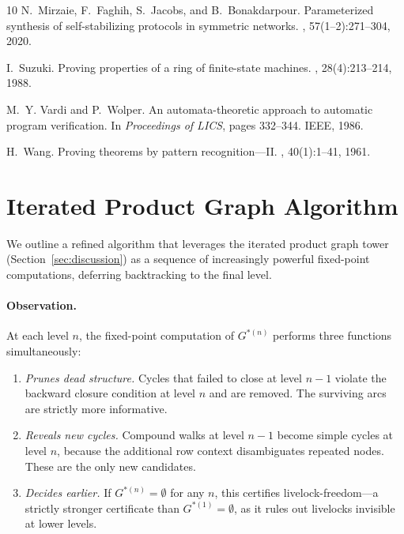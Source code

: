 \documentclass[11pt]{article}
\begin{document}
\begin{thebibliography}{10}
N.~Mirzaie, F.~Faghih, S.~Jacobs, and B.~Bonakdarpour.
\newblock Parameterized synthesis of self-stabilizing protocols in symmetric networks.
, 57(1--2):271--304, 2020.

I.~Suzuki.
\newblock Proving properties of a ring of finite-state machines.
, 28(4):213--214, 1988.

M.~Y. Vardi and P.~Wolper.
\newblock An automata-theoretic approach to automatic program verification.
\newblock In {\em Proceedings of LICS}, pages 332--344. IEEE, 1986.

H.~Wang.
\newblock Proving theorems by pattern recognition---{II}.
, 40(1):1--41, 1961.

\end{thebibliography}

\appendix

\section{Iterated Product Graph Algorithm}
\label{app:iterated}

We outline a refined algorithm that leverages the iterated product graph tower (Section~\ref{sec:discussion}) as a sequence of increasingly powerful fixed-point computations, deferring backtracking to the final level.

\paragraph{Observation.} At each level $n$, the fixed-point computation of $G^{*(n)}$ performs three functions simultaneously:
\begin{enumerate}[nosep]
\item \emph{Prunes dead structure.} Cycles that failed to close at level $n-1$ violate the backward closure condition at level $n$ and are removed. The surviving arcs are strictly more informative.
\item \emph{Reveals new cycles.} Compound walks at level $n-1$ become simple cycles at level $n$, because the additional row context disambiguates repeated nodes. These are the only new candidates.
\item \emph{Decides earlier.} If $G^{*(n)} = \emptyset$ for any $n$, this certifies livelock-freedom---a strictly stronger certificate than $G^{*(1)} = \emptyset$, as it rules out livelocks invisible at lower levels.
\end{enumerate}
\end{document}
